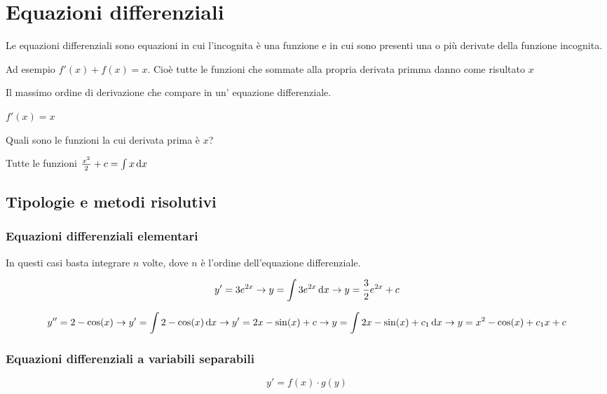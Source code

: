 \chapter{Equazioni differenziali}

Le equazioni differenziali sono equazioni in cui l'incognita è una funzione e in cui sono presenti una o più derivate della funzione incognita.

Ad esempio $f'(x) + f(x) = x$. Cioè tutte le funzioni che sommate alla propria derivata primma danno come risultato $x$

\begin{definition}[Ordine]
Il massimo ordine di derivazione che compare in un' equazione differenziale.
\end{definition}

\begin{example}
$f'(x) = x$

Quali sono le funzioni la cui derivata prima è $x$?

Tutte le funzioni $\frac{x^2}{2} + c = \int x \mathop{}\!\mathrm{d} x$
\end{example}

\section{Tipologie e metodi risolutivi}

\subsection{Equazioni differenziali elementari}

In questi casi basta integrare $n$ volte, dove $n$ è l'ordine dell'equazione differenziale.

\begin{example}
$$
y' = 3e^{2x} \to
y = \int 3e^{2x} \mathop{}\!\mathrm{d} x \to
y = \frac{3}{2} e^{2x} + c
$$
\end{example}

\begin{example}
$$
y'' = 2-\cos(x) \to
y' = \int 2-\cos(x) \mathop{}\!\mathrm{d} x \to
y' = 2x-\sin(x) + c \to
y = \int 2x-\sin(x) + c_1 \mathop{}\!\mathrm{d} x \to
y = x^2-\cos(x) + c_1x + c
$$
\end{example}

\subsection{Equazioni differenziali a variabili separabili}

$$y' = f(x) \cdot g(y)$$

